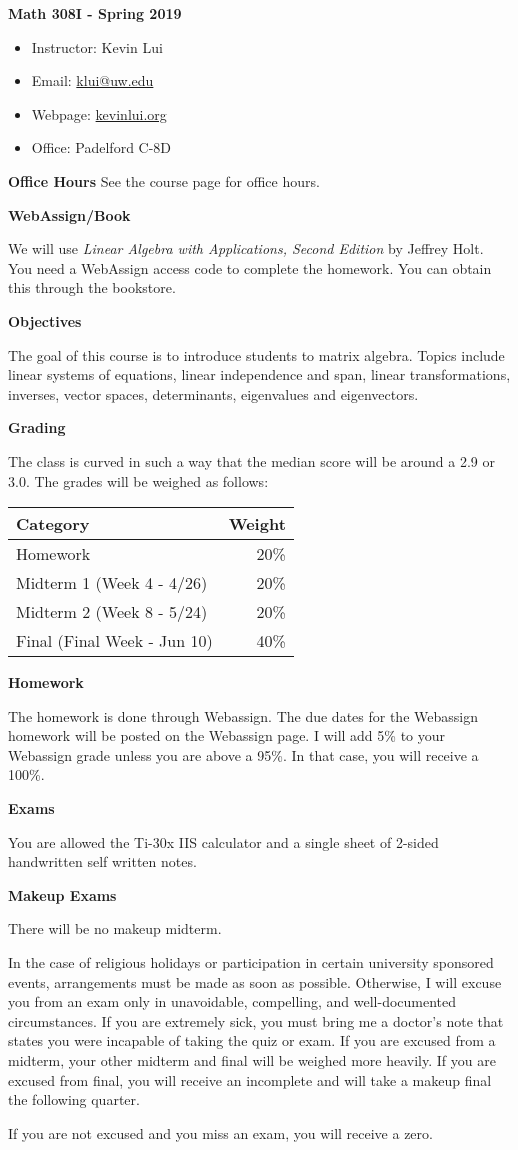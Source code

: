\documentclass{article}
\begin{document}
\textbf{\huge  Math 308I - Spring 2019}
\begin{itemize}
    \item
        Instructor: Kevin Lui
    \item
        Email: \href{mailto:klui@uw.edu}{klui@uw.edu}
    \item
        Webpage: \url{kevinlui.org}
    \item
        Office: Padelford C-8D
\end{itemize}

\textbf{Office Hours}
See the course page for office hours.

\textbf{WebAssign/Book}

We will use \textit{Linear Algebra with Applications, Second Edition} by
Jeffrey Holt. You need a WebAssign access code to complete the homework. You
can obtain this through the bookstore.

\textbf{Objectives}

The goal of this course is to introduce students to matrix algebra. Topics
include linear systems of equations, linear independence and span, linear
transformations, inverses, vector spaces, determinants, eigenvalues and
eigenvectors.

\textbf{Grading}

The class is curved in such a way that the median score will be around a 2.9 or
3.0. The grades will be weighed as follows:

\begin{tabular}{ l r }
    Category  & Weight   \\
    \hline
    Homework  & 20\%      \\
    Midterm 1 (Week 4 - 4/26) & 20\%      \\
    Midterm 2 (Week 8 - 5/24) & 20\%      \\
    Final (Final Week - Jun 10)    & 40\%
\end{tabular}

\textbf{Homework}

The homework is done through Webassign. The due dates for the Webassign
homework will be posted on the Webassign page. I will add 5\% to your
Webassign grade unless you are above a 95\%. In that case, you will receive a
100\%.

\textbf{Exams}

You are allowed the Ti-30x IIS calculator and a single sheet of 2-sided
handwritten self written notes.

\textbf{Makeup Exams}

There will be no makeup midterm.

In the case of religious holidays or participation in certain university
sponsored events, arrangements must be made as soon as possible. Otherwise, I
will excuse you from an exam only in unavoidable, compelling, and
well-documented circumstances. If you are extremely sick, you must bring me a
doctor's note that states you were incapable of taking the quiz or exam. If you
are excused from a midterm, your other midterm and final will be weighed more
heavily. If you are excused from final, you will receive an incomplete and will
take a makeup final the following quarter.

If you are not excused and you miss an exam, you will receive a zero.
\end{document}
